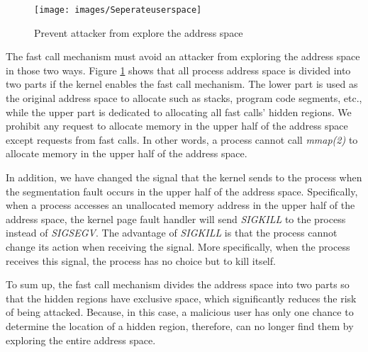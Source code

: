 \begin{figure}[H]
  \centering
  \texttt{[image: images/Seperateuserspace]}
  \caption[Short description]{Prevent attacker from explore the address space}
  \label{fig:Seperateuserspace}
\end{figure}


The fast call mechanism must avoid an attacker from 
exploring the address space in those two ways. Figure 
\ref{fig:Seperateuserspace} shows that all process address space is divided into 
two parts if the kernel enables the fast call mechanism. 
The lower part is used as the original address space to 
allocate such as stacks, program code segments, etc., 
while the upper part is dedicated to allocating all 
fast calls' hidden regions.  We prohibit any request 
to allocate memory in the upper half of the address 
space except requests from fast calls. In other words, 
a process cannot call \emph{mmap(2)} to allocate memory in the 
upper half of the address space.

In addition, we have changed the signal that the kernel 
sends to the process when the segmentation fault occurs 
in the upper half of the address space. Specifically, 
when a process accesses an unallocated memory address 
in the upper half of the address space, the kernel page 
fault handler will send \emph{SIGKILL} to the process instead 
of \emph{SIGSEGV}. The advantage of \emph{SIGKILL} is that the process 
cannot change its action when receiving the signal. 
More specifically, when the process receives this signal, 
the process has no choice but to kill itself.

To sum up, the fast call mechanism divides the address 
space into two parts so that the hidden regions have 
exclusive space, which significantly reduces the risk 
of being attacked. Because, in this case, a malicious 
user has only one chance to determine the location of 
a hidden region, therefore, can no longer find them by
 exploring the entire address space.


